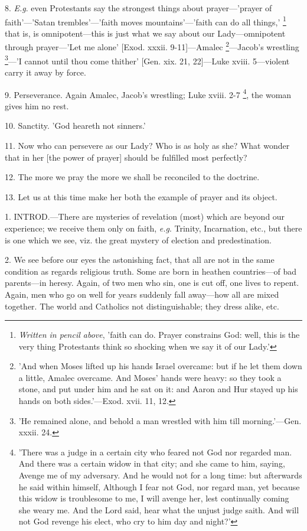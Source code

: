 8. \emph{E.g}. even Protestants say the strongest
things about prayer—'prayer of faith'—'Satan trembles'—'faith
moves mountains'—'faith can do all things,' \footnote{\emph{Written in pencil above},
'faith can do. Prayer constrains God: well, this is the very thing
Protestants think so shocking when we say it of our Lady.'} that is, is omnipotent—this is just what we say about our
Lady—omnipotent through prayer—'Let me alone' [Exod. xxxii.
9-11]—Amalec \footnote{'And when Moses lifted up
his hands Israel overcame: but if he let them down a little, Amalec
overcame. And Moses' hands were heavy: so they took a stone, and put
under him and he sat on it: and Aaron and Hur stayed up his hands on
both sides.'—Exod. xvii. 11, 12.}—Jacob's
wrestling \footnote{'He remained alone, and
behold a man wrestled with him till morning.'—Gen. xxxii. 24.}—'I cannot
until thou come thither' [Gen. xix. 21, 22]—Luke xviii. 5—violent
carry it away by force.

9. Perseverance. Again Amalec, Jacob's wrestling;
Luke xviii. 2-7 \footnote{'There was a judge in a
certain city who feared not God nor regarded man. And there was a
certain widow in that city; and she came to him, saying, Avenge me of
my adversary. And he would not for a long time: but afterwards he said
within himself, Although I fear not God, nor regard man, yet because
this widow is troublesome to me, I will avenge her, lest continually
coming she weary me. And the Lord said, hear what the unjust judge
saith. And will not God revenge his elect, who cry to him day and
night?'}, the
woman gives him no rest.

10. Sanctity. 'God heareth not sinners.'

11. Now who can persevere as our Lady? Who is as
holy as she? What wonder that in her [the power of prayer] should be
fulfilled most perfectly?

12. The more we pray the more we shall be
reconciled to the doctrine.

13. Let us at this time make her both the example
of prayer and its object.


1. INTROD.—There
are mysteries of revelation (most) which are beyond our experience; we
receive them only on faith, \emph{e.g}. Trinity, Incarnation, etc.,
but there is one which we see, viz. the great mystery of election and
predestination.

2. We see before our eyes the astonishing fact,
that all are not in the same condition as regards religious truth.
Some are born in heathen countries—of bad parents—in heresy.
Again, of two men who sin, one is cut off, one lives to repent. Again,
men who go on well for years suddenly fall away—how all are mixed
together. The world and Catholics not distinguishable; they dress
alike, etc.

